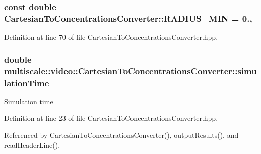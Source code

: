 \hypertarget{classmultiscale_1_1video_1_1CartesianToConcentrationsConverter_a6c96a5325ecd3d99649f9cccff2f06a2}{
\subsubsection[{R\-A\-D\-I\-U\-S\-\_\-\-M\-I\-N}]{\setlength{\rightskip}{0pt plus 5cm}const double Cartesian\-To\-Concentrations\-Converter\-::\-R\-A\-D\-I\-U\-S\-\_\-\-M\-I\-N = 0.\hspace{0.3cm}{\ttfamily [static]}, {\ttfamily [private]}}}\label{classmultiscale_1_1video_1_1CartesianToConcentrationsConverter_a6c96a5325ecd3d99649f9cccff2f06a2}


Definition at line 70 of file Cartesian\-To\-Concentrations\-Converter.\-hpp.

\hypertarget{classmultiscale_1_1video_1_1CartesianToConcentrationsConverter_a6e66af60b82513b3186fdb32cad44597}{
\subsubsection[{simulation\-Time}]{\setlength{\rightskip}{0pt plus 5cm}double multiscale\-::video\-::\-Cartesian\-To\-Concentrations\-Converter\-::simulation\-Time\hspace{0.3cm}{\ttfamily [private]}}}\label{classmultiscale_1_1video_1_1CartesianToConcentrationsConverter_a6e66af60b82513b3186fdb32cad44597}
Simulation time 

Definition at line 23 of file Cartesian\-To\-Concentrations\-Converter.\-hpp.



Referenced by Cartesian\-To\-Concentrations\-Converter(), output\-Results(), and read\-Header\-Line().

